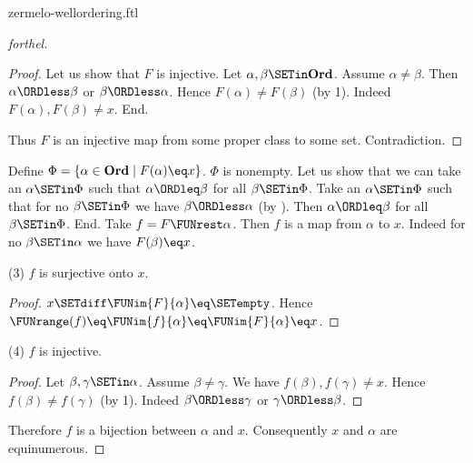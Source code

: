 \documentclass{stex}
\newcommand\Ord{\textbf{Ord}}
\begin{document}
\begin{smodule}{zermelo-wellordering.ftl}
\begin{proof}[forthel]
\begin{proof}
    Let us show that $F$ is injective.
      Let $\alpha, \beta \SETin \Ord$.
      Assume $\alpha \neq \beta$.
      Then $\alpha \ORDless \beta$ or $\beta \ORDless \alpha$.
      Hence $F(\alpha) \neq F(\beta)$ (by 1).
      Indeed $F(\alpha), F(\beta) \neq x$.
    End.

    Thus $F$ is an injective map from some proper class to some set.
    Contradiction.
  \end{proof}

  Define $\Phi = \{ \alpha \in \Ord \mid F(\alpha) \eq x \}$.
  $\Phi$ is nonempty.
  Let us show that we can take an $\alpha \SETin \Phi$ such that $\alpha \ORDleq \beta$ for all $\beta \SETin \Phi$.
    Take an $\alpha \SETin \Phi$ such that for no $\beta \SETin \Phi$ we have $\beta \ORDless \alpha$ (by ).
    Then $\alpha \ORDleq \beta$ for all $\beta \SETin \Phi$.
  End.
  Take $f = F \FUNrest \alpha$.
  Then $f$ is a map from $\alpha$ to $x$.
  Indeed for no $\beta \SETin \alpha$ we have $F(\beta) \eq x$.

  (3) $f$ is surjective onto $x$.
  \begin{proof}
    $x \SETdiff \FUNim{F}{\alpha} \eq \SETempty$.
    Hence $\FUNrange(f)
      \eq \FUNim{f}{\alpha}
      \eq \FUNim{F}{\alpha}
      \eq x$.
  \end{proof}

  (4) $f$ is injective.
  \begin{proof}
    Let $\beta, \gamma \SETin \alpha$.
    Assume $\beta \neq \gamma$.
    We have $f(\beta), f(\gamma) \neq x$.
    Hence $f(\beta) \neq f(\gamma)$ (by 1).
    Indeed $\beta \ORDless \gamma$ or $\gamma \ORDless \beta$.
  \end{proof}

  Therefore $f$ is a bijection between $\alpha$ and $x$.
  Consequently $x$ and $\alpha$ are equinumerous.
\end{proof}

\printbibliography
{}
\end{smodule}
\end{document}
